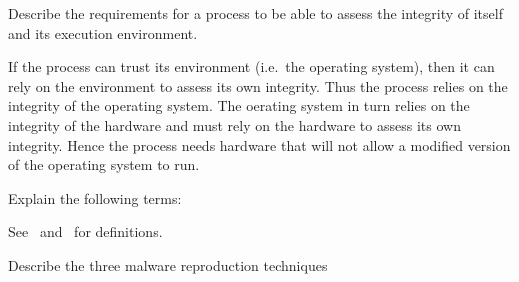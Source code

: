 \documentclass[svv,addpoints]{miunexam}
\begin{document}
\begin{questions}
\question[3]\label{q:trustcomp}
Describe the requirements for a process to be able to assess the integrity of 
itself and its execution environment.

\begin{solution}
  If the process can trust its environment (i.e.\ the operating system), then 
  it can rely on the environment to assess its own integrity.
  Thus the process relies on the integrity of the operating system.
  The oerating system in turn relies on the integrity of the hardware and must 
  rely on the hardware to assess its own integrity.
  Hence the process needs hardware that will not allow a modified version of 
  the operating system to run.
\end{solution}



\question\label{q:crypto:foundations:E}
  Explain the following terms:

  \begin{solution}
    See~\cite{Gollmann2011cs} and~\cite{Anderson2008sea} for definitions.
  \end{solution}


  
\question\label{q:software}
Describe the three malware reproduction techniques
\end{questions}
\end{document}
